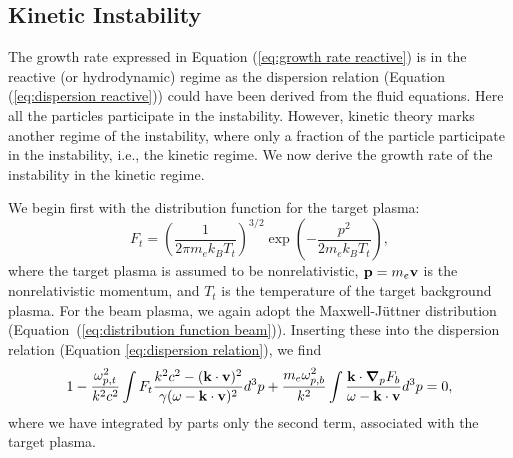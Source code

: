 \documentclass[usenatbib,iop,apj,numberedappendix]{aeb_emulateapj_2015}
\newcommand\bmath[1] {\mbox{\boldmath$\rm #1$}}
\newcommand{\vel}{\ensuremath{\bmath{v}}}
\newcommand{\pmom}{\ensuremath{\bmath{p}}}
\newcommand{\gradp}{\ensuremath{\bmath{\nabla}_p}}
\newcommand{\betavec}{\ensuremath{\bmath{\beta}}}
\newcommand{\kvec}{\ensuremath{\bmath{k}}}
\newcommand{\betabeam}{\ensuremath{\bmath{\beta}_{\rm b}}}
\newcommand{\gammabeam}{\ensuremath{\gamma_{\rm b}}}
\begin{document}
\subsection{Kinetic Instability}

The growth rate expressed in Equation (\ref{eq:growth rate reactive}) is in the reactive (or hydrodynamic) regime as the dispersion relation (Equation (\ref{eq:dispersion reactive})) could have been derived from the fluid equations.  Here all the particles participate in the instability.  However, kinetic theory marks another regime of the instability, where only a fraction of the particle participate in the instability, i.e., the kinetic regime.  We now derive the growth rate of the instability in the kinetic regime.

We begin first with the distribution function for the target plasma:
\begin{equation}
 F_t = \left(\frac{1}{2\pi m_e k_B T_t}\right)^{3/2}\exp\left(-\frac{p^2}{2m_e k_B T_t}\right),
\end{equation}
where the target plasma is assumed to be nonrelativistic, $\bmath{p}=m_e\vel$ is the nonrelativistic momentum,  and $T_t$ is the temperature of the target background plasma.
For the beam plasma, we again adopt the Maxwell-J{\"u}ttner distribution (Equation~(\ref{eq:distribution function beam})).
Inserting these into the dispersion relation (Equation \ref{eq:dispersion relation}), we find
\begin{equation}\label{eq:dispersion kinetic}
 1 - \frac{\omega_{p,t}^2}{k^2c^2}\int F_t\frac{k^2c^2 - (\kvec\cdot\vel)^2}{\gamma(\omega - \kvec\cdot\vel)^2} d^3p + \frac{m_e\omega_{p,b}^2}{k^2}\int \frac{\kvec\cdot\gradp F_b}{\omega - \kvec\cdot\vel}d^3p  = 0,
\end{equation}
where we have integrated by parts only the second term, associated with the target plasma. 
\end{document}
